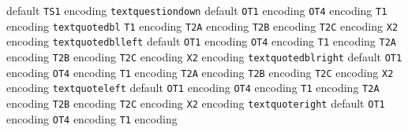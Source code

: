 \documentclass[twoside]{ltxdoc}
\makeatletter
\renewenvironment{theindex}{%
   \@restonecoltrue
   \if@twocolumn\@restonecolfalse\fi
   \columnseprule \z@
   \columnsep 35\p@
   \twocolumn[\index@prologue]%
   \IndexParms
   \let\item\@idxitem
   \ignorespaces
}{\if@restonecol\onecolumn\else\clearpage\fi}
\makeatother
\begin{document}
\begin{theindex}
    \subitem default\pfill {}
    \subitem \texttt  {TS1} encoding\pfill {}
  \item \texttt  {textquestiondown}\efill 
    \subitem default\pfill {}
    \subitem \texttt  {OT1} encoding\pfill {}
    \subitem \texttt  {OT4} encoding\pfill {}
    \subitem \texttt  {T1} encoding\pfill {}
  \item \texttt  {textquotedbl}\efill 
    \subitem \texttt  {T1} encoding\pfill {}
    \subitem \texttt  {T2A} encoding\pfill {}
    \subitem \texttt  {T2B} encoding\pfill {}
    \subitem \texttt  {T2C} encoding\pfill {}
    \subitem \texttt  {X2} encoding\pfill {}
  \item \texttt  {textquotedblleft}\efill 
    \subitem default\pfill {}
    \subitem \texttt  {OT1} encoding\pfill {}
    \subitem \texttt  {OT4} encoding\pfill {}
    \subitem \texttt  {T1} encoding\pfill {}
    \subitem \texttt  {T2A} encoding\pfill {}
    \subitem \texttt  {T2B} encoding\pfill {}
    \subitem \texttt  {T2C} encoding\pfill {}
    \subitem \texttt  {X2} encoding\pfill {}
  \item \texttt  {textquotedblright}\efill 
    \subitem default\pfill {}
    \subitem \texttt  {OT1} encoding\pfill {}
    \subitem \texttt  {OT4} encoding\pfill {}
    \subitem \texttt  {T1} encoding\pfill {}
    \subitem \texttt  {T2A} encoding\pfill {}
    \subitem \texttt  {T2B} encoding\pfill {}
    \subitem \texttt  {T2C} encoding\pfill {}
    \subitem \texttt  {X2} encoding\pfill {}
  \item \texttt  {textquoteleft}\efill 
    \subitem default\pfill {}
    \subitem \texttt  {OT1} encoding\pfill {}
    \subitem \texttt  {OT4} encoding\pfill {}
    \subitem \texttt  {T1} encoding\pfill {}
    \subitem \texttt  {T2A} encoding\pfill {}
    \subitem \texttt  {T2B} encoding\pfill {}
    \subitem \texttt  {T2C} encoding\pfill {}
    \subitem \texttt  {X2} encoding\pfill {}
  \item \texttt  {textquoteright}\efill 
    \subitem default\pfill {}
    \subitem \texttt  {OT1} encoding\pfill {}
    \subitem \texttt  {OT4} encoding\pfill {}
    \subitem \texttt  {T1} encoding\pfill {}

\end{theindex}
\end{document}
